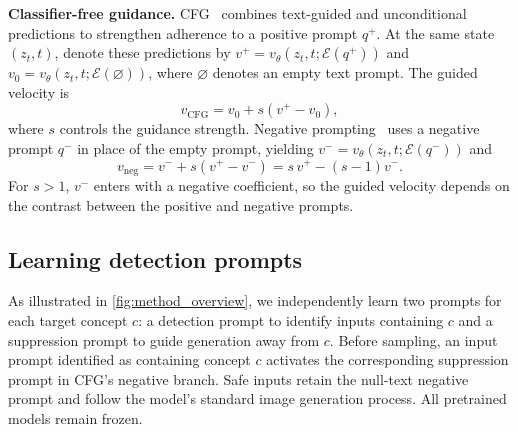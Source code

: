 \noindent\textbf{Classifier-free guidance.}
CFG~\cite{CFG} combines text-guided and unconditional predictions to strengthen adherence to a positive prompt $q^{+}$.
At the same state $(z_t,t)$, denote these predictions by $v^{+}=v_\theta(z_t,t;\mathcal E(q^{+}))$ and $v_0=v_\theta(z_t,t;\mathcal E(\varnothing))$, where $\varnothing$ denotes an empty text prompt.
The guided velocity is
\begin{equation}
    v_{\mathrm{CFG}}=v_0+s(v^{+}-v_0),
    \label{eq:cfg_velocity}
\end{equation}
where $s$ controls the guidance strength.
Negative prompting~\cite{Ban_2024_ECCV} uses a negative prompt $q^{-}$ in place of the empty prompt, yielding $v^{-}=v_\theta(z_t,t;\mathcal E(q^{-}))$ and
\begin{equation}
     v_{\mathrm{neg}}
    =v^{-}+s(v^{+}-v^{-})
    =s\,v^{+}-(s-1)v^{-}.
    \label{eq:negative_cfg_velocity}
\end{equation}
For $s>1$, $v^{-}$ enters with a negative coefficient, so the guided velocity depends on the contrast between the positive and negative prompts.

\subsection{Learning detection prompts}
\label{sec:detection_prompt}

As illustrated in \cref{fig:method_overview}, we independently learn two prompts for each target concept $c$: a detection prompt to identify inputs containing $c$ and a suppression prompt to guide generation away from $c$.
Before sampling, an input prompt identified as containing concept $c$ activates the corresponding suppression prompt in CFG's negative branch. Safe inputs retain the null-text negative prompt and follow the model's standard image generation process.
All pretrained models remain frozen.

